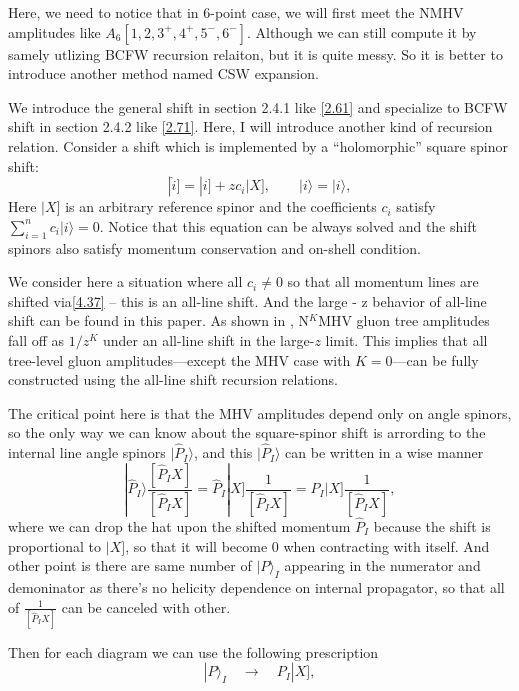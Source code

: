 \documentclass[12pt]{article}
\numberwithin{equation}{section}
\newcommand{\aket}[1]{|#1\rangle}
\newcommand{\sket}[1]{|#1]}
\begin{document}
Here, we need to notice that in 6-point case, we will first meet the NMHV amplitudes like $A_6[1,2,3^+,4^+,5^-,6^-]$. Although we can still compute it by samely utlizing BCFW recursion relaiton, but it is quite messy. So it is better to introduce another method named CSW expansion. 

We introduce the general shift in section 2.4.1 like \eqref{2.61} and specialize to BCFW shift in section 2.4.2 like \eqref{2.71}. Here, I will introduce another kind of recursion relation. Consider a shift which is implemented by a ``holomorphic'' square spinor shift:
\begin{equation}
    \sket{\hat{i}}=\sket{i}+zc_i\sket{X},\qquad \aket{i}=\aket{i},
    \label{4.37}
\end{equation}
Here $\sket{X}$ is an arbitrary reference spinor and the coefficients $c_i$ satisfy $\sum_{i=1}^{n}c_i\aket{i}=0$. Notice that this equation can be always solved and the shift spinors also satisfy momentum conservation and on-shell condition. 

We consider here a situation where all $c_i \neq 0$ so that all momentum lines are shifted via\eqref{4.37} – this is an all-line shift. And the large - z behavior of all-line shift can be found in this paper\cite{Cohen:2010mi}.
As shown in \cite{Elvang:2008vz}, N$^{K}$MHV gluon tree amplitudes fall off as $1/z^K$ under an all-line shift in the large-$z$ limit. This implies that all tree-level gluon amplitudes---except the MHV case with $K = 0$---can be fully constructed using the all-line shift recursion relations. 

The critical point here is that the MHV amplitudes depend only on angle spinors, so the only way we can know about the square-spinor
shift is arrording to the internal line angle spinors $\aket{\hat{P}_I}$, and this $\aket{\hat{P}_I}$ can be written in a wise manner
\begin{equation}
    \aket{\hat{P}_I}\frac{[\hat{P}_I X]}{[\hat{P}_I X]}=\hat{P}_I\sket{X}\frac{1}{[\hat{P}_IX]}=P_I\sket{X}\frac{1}{[\hat{P}_IX]},
\end{equation}
where we can drop the hat upon the shifted momentum $\hat{P}_I$ because the shift is proportional to $\sket{X}$, so that it will become 0 when contracting with itself. And other point is there are same number of $\aket{P}_I$ appearing in the numerator and demoninator as there's no helicity dependence on internal propagator, so that all of $\frac{1}{[\hat{P}_IX]}$ can be canceled with other. 

Then for each diagram we can use the following prescription
\begin{equation}
    \aket{P}_I \quad \rightarrow \quad P_I\sket{X}, 
\end{equation}
\end{document}

